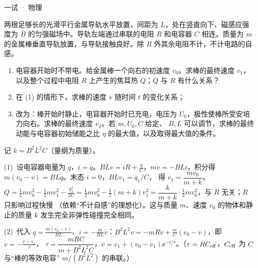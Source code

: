 \documentclass[cjk=noto, seal=first]{mojing-exam}
\begin{document}
\begin{paper}[time={建议 2 小时（训练设置）}, full=100]{一试 · 物理}
\begin{questions}
\question[20]
\begin{withfigure}[.3]{%
  }
两根足够长的光滑平行金属导轨水平放置，间距为 $L$，处在竖直向下、磁感应强度为 $B$ 的匀强磁场中。导轨左端通过串联的电阻 $R$ 和电容器 $C$
相连。质量为 $m$ 的金属棒垂直导轨放置，与导轨接触良好。除 $R$ 外其余电阻不计，不计电路的自感。
\end{withfigure}
\begin{enumerate}
  \item 电容器开始时不带电。给金属棒一个向右的初速度 $v_0$。求棒的最终速度 $v_1$，以及整个过程中电阻 $R$ 上产生的焦耳热 $Q$；$Q$ 与 $R$ 有什么关系？
  \item 在 (1) 的情形下，求棒的速度 $v$ 随时间 $t$ 的变化关系；
  \item 改为：棒开始时静止，电容器开始时已充电，电压为 $U_0$，极性使棒所受安培力向右。求棒的最终速度 $v_2$。若 $m,U_0,C$ 给定、
        $B,L$ 可以调节，求棒的最终动能与电容器初始储能之比 $\eta$ 的最大值，以及取得最大值的条件。
\end{enumerate}
\answerspace{2cm}
\begin{solution}
记 $k=B^2L^2C$（量纲为质量）。

(1)~设电容器电量为 $q$，$i=\dot q$。$BLv=iR+\frac qC$，$m\dot v=-BLi$，积分得 $m(v_0-v)=BLq$。末态 $i=0$，$BLv_1=q_1/C$，
得 $v_1=\dfrac{mv_0}{m+k}$。
$Q=\frac12mv_0^2-\frac12mv_1^2-\frac{q_1^2}{2C}=\frac12mv_0^2-\frac12(m+k)v_1^2=\dfrac{k}{m+k}\cdot\frac12mv_0^2$，与 $R$ 无关；$R$ 只影响过程快慢
（依赖“不计自感”的理想化）。这与质量 $m$、速度 $v_0$ 的物体和静止的质量 $k$ 发生完全非弹性碰撞完全相同。

(2)~代入 $q=\frac{m(v_0-v)}{BL}$、$i=-\frac m{BL}\dot v$：$B^2L^2v=-mR\dot v+\frac mC(v_0-v)$，即 $\dot v=-\frac{v-v_1}{\tau}$，
$\tau=\dfrac{mRC}{m+B^2L^2C}$，$v=v_1+(v_0-v_1)\ee^{-t/\tau}$。（$\tau=RC_{\rm eff}$，$C_{\rm eff}$ 为 $C$ 与“棒的等效电容” $m/(B^2L^2)$ 的串联。）


\end{solution}
\end{questions}
\end{paper}
\end{document}
